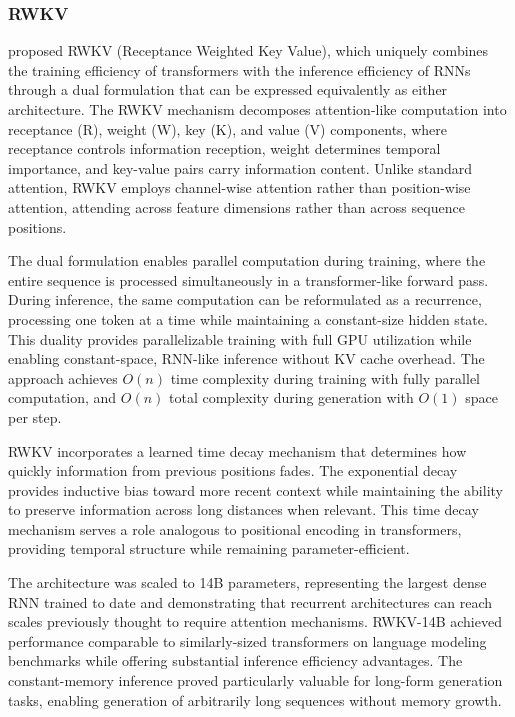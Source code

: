 \subsubsection{RWKV}

\citet{peng2023rwkv} proposed RWKV (Receptance Weighted Key Value), which uniquely combines the training efficiency of transformers with the inference efficiency of RNNs through a dual formulation that can be expressed equivalently as either architecture. The RWKV mechanism decomposes attention-like computation into receptance (R), weight (W), key (K), and value (V) components, where receptance controls information reception, weight determines temporal importance, and key-value pairs carry information content. Unlike standard attention, RWKV employs channel-wise attention rather than position-wise attention, attending across feature dimensions rather than across sequence positions.

The dual formulation enables parallel computation during training, where the entire sequence is processed simultaneously in a transformer-like forward pass. During inference, the same computation can be reformulated as a recurrence, processing one token at a time while maintaining a constant-size hidden state. This duality provides parallelizable training with full GPU utilization while enabling constant-space, RNN-like inference without KV cache overhead. The approach achieves $O(n)$ time complexity during training with fully parallel computation, and $O(n)$ total complexity during generation with $O(1)$ space per step.

RWKV incorporates a learned time decay mechanism that determines how quickly information from previous positions fades. The exponential decay provides inductive bias toward more recent context while maintaining the ability to preserve information across long distances when relevant. This time decay mechanism serves a role analogous to positional encoding in transformers, providing temporal structure while remaining parameter-efficient.

The architecture was scaled to 14B parameters, representing the largest dense RNN trained to date and demonstrating that recurrent architectures can reach scales previously thought to require attention mechanisms. RWKV-14B achieved performance comparable to similarly-sized transformers on language modeling benchmarks while offering substantial inference efficiency advantages. The constant-memory inference proved particularly valuable for long-form generation tasks, enabling generation of arbitrarily long sequences without memory growth.


